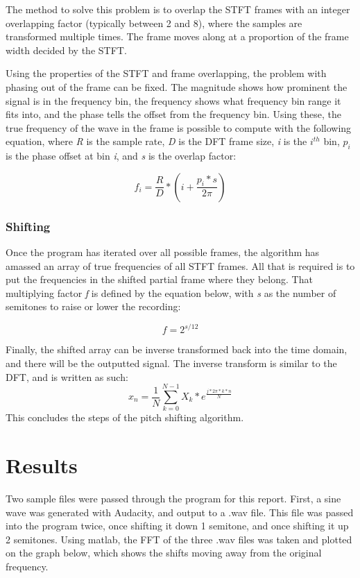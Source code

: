 \documentclass{article}
\begin{document}
The method to solve this problem is to overlap the STFT frames with an integer overlapping factor (typically between 2 and 8), where the samples are transformed multiple times. The frame moves along at a proportion of the frame width decided by the STFT.

Using the properties of the STFT and frame overlapping, the problem with phasing out of the frame can be fixed. The magnitude shows how prominent the signal is in the frequency bin, the frequency shows what frequency bin range it fits into, and the phase tells the offset from the frequency bin.  Using these, the true frequency of the wave in the frame is possible to compute with the following equation, where \textit{R} is the sample rate, \textit{D} is the DFT frame size, \textit{i} is the $i^{th}$ bin, \textit{$p_i$} is the phase offset at bin \textit{i}, and \textit{s} is the overlap factor:

\begin{equation}
f_i = \frac{R}{D} * (i + \frac{p_i * s}{2\pi})
\end{equation}
	
\subsubsection{Shifting}
Once the program has iterated over all possible frames, the algorithm has amassed an array of true frequencies of all STFT frames. All that is required is to put the frequencies in the shifted partial frame where they belong. That multiplying factor \textit{f} is defined by the equation below, with \textit{s} as the number of semitones to raise or lower the recording:

\begin{equation}
f = 2^{s/12}
\end{equation} 

Finally, the shifted array can be inverse transformed back into the time domain, and there will be the outputted signal. The inverse transform is similar to the DFT, and is written as such:
\begin{equation}
x_n = \frac{1}{N} \sum_{k=0}^{N-1} X_k * e^{\frac{j*2\pi*k*n}{N}}
\end{equation}
This concludes the steps of the pitch shifting algorithm.

\section{Results}
Two sample files were passed through the program for this report. First, a sine wave was generated with Audacity, and output to a .wav file. This file was passed into the program twice, once shifting it down 1 semitone, and once shifting it up 2 semitones. Using matlab, the FFT of the three .wav files was taken and plotted on the graph below, which shows the shifts moving away from the original frequency.
\end{document}
